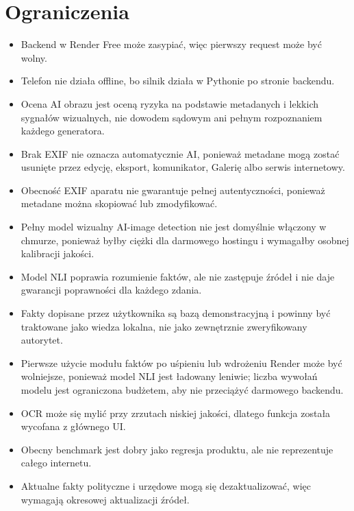 \documentclass[12pt,a4paper]{article}
\begin{document}
\section{Ograniczenia}
\begin{itemize}
  \item Backend w Render Free może zasypiać, więc pierwszy request może być wolny.
  \item Telefon nie działa offline, bo silnik działa w Pythonie po stronie backendu.
  \item Ocena AI obrazu jest oceną ryzyka na podstawie metadanych i lekkich sygnałów wizualnych, nie dowodem sądowym ani pełnym rozpoznaniem każdego generatora.
  \item Brak EXIF nie oznacza automatycznie AI, ponieważ metadane mogą zostać usunięte przez edycję, eksport, komunikator, Galerię albo serwis internetowy.
  \item Obecność EXIF aparatu nie gwarantuje pełnej autentyczności, ponieważ metadane można skopiować lub zmodyfikować.
  \item Pełny model wizualny AI-image detection nie jest domyślnie włączony w chmurze, ponieważ byłby ciężki dla darmowego hostingu i wymagałby osobnej kalibracji jakości.
  \item Model NLI poprawia rozumienie faktów, ale nie zastępuje źródeł i nie daje gwarancji poprawności dla każdego zdania.
  \item Fakty dopisane przez użytkownika są bazą demonstracyjną i powinny być traktowane jako wiedza lokalna, nie jako zewnętrznie zweryfikowany autorytet.
  \item Pierwsze użycie modułu faktów po uśpieniu lub wdrożeniu Render może być wolniejsze, ponieważ model NLI jest ładowany leniwie; liczba wywołań modelu jest ograniczona budżetem, aby nie przeciążyć darmowego backendu.
  \item OCR może się mylić przy zrzutach niskiej jakości, dlatego funkcja została wycofana z głównego UI.
  \item Obecny benchmark jest dobry jako regresja produktu, ale nie reprezentuje całego internetu.
  \item Aktualne fakty polityczne i urzędowe mogą się dezaktualizować, więc wymagają okresowej aktualizacji źródeł.
\end{itemize}
\end{document}

